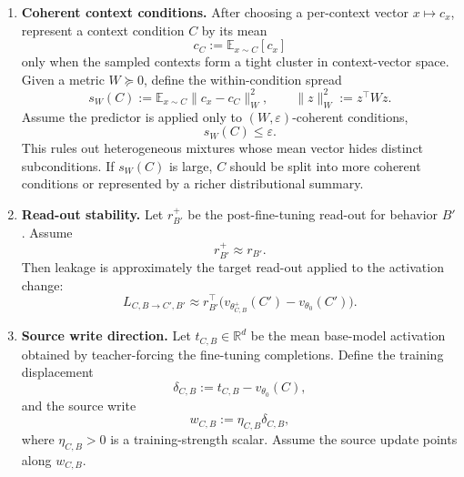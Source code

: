 \documentclass[11pt]{article}
\theoremstyle{definition}
\theoremstyle{definition}
\theoremstyle{assumptionstyle}
\newcommand{\E}{\mathbb{E}}            %
\begin{document}
\begin{enumerate}
\item[\textbf{A3b.}] \textbf{Coherent context conditions.}
After choosing a per-context vector \(x\mapsto c_x\), represent a context
condition \(C\) by its mean
\[
c_C:=\E_{x\sim C}[c_x]
\]
only when the sampled contexts form a tight cluster in context-vector space.
Given a metric \(W\succeq 0\), define the within-condition spread
\[
s_W(C)
:=
\E_{x\sim C}\|c_x-c_C\|_W^2,
\qquad
\|z\|_W^2:=z^\top Wz .
\]
Assume the predictor is applied only to \((W,\varepsilon)\)-coherent conditions,
\[
s_W(C)\le \varepsilon .
\]
This rules out heterogeneous mixtures whose mean vector hides distinct
subconditions. If \(s_W(C)\) is large, \(C\) should be split into more coherent
conditions or represented by a richer distributional summary.

\item[\textbf{A4.}] \textbf{Read-out stability.}
Let \(r^+_{B'}\) be the post-fine-tuning read-out for behavior \(B'\). Assume
\[
r^+_{B'}\approx r_{B'}.
\]
Then leakage is approximately the target read-out applied to the activation
change:
\[
L_{C,B\to C',B'}
\approx
r_{B'}^\top
\big(v_{\theta^+_{C,B}}(C')-v_{\theta_0}(C')\big).
\]


\item[\textbf{A5.}] \textbf{Source write direction.}
Let \(t_{C,B}\in\mathbb R^d\) be the mean base-model activation obtained by
teacher-forcing the fine-tuning completions. Define the training displacement
\[
\delta_{C,B}:=t_{C,B}-v_{\theta_0}(C),
\]
and the source write
\[
w_{C,B}:=\eta_{C,B}\delta_{C,B},
\]
where \(\eta_{C,B}>0\) is a training-strength scalar. Assume the source update
points along \(w_{C,B}\).


\end{enumerate}
\end{document}
